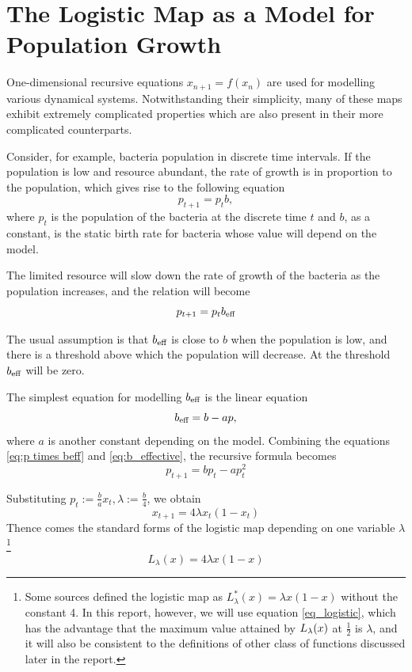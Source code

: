 \section{The Logistic Map as a Model for Population Growth}

One-dimensional recursive equations $x_{n+1} = f(x_n)$ are used for modelling various dynamical systems. 
Notwithstanding their simplicity, many of these maps exhibit extremely complicated properties which are also present in their more complicated counterparts.

Consider, for example, bacteria population in discrete time intervals. 
If the population is low and resource abundant, the rate of growth is in proportion to the population, which gives rise to the following equation
\begin{equation}\label{eq:1d iterative map}
p_{t+1} = p_{t} b,
\end{equation}
where $p_{t}$ is the population of the bacteria at the discrete time $t$ and $b$, as a constant, is the static birth rate for bacteria whose value will depend on the model.

The limited resource will slow down the rate of growth of the bacteria as the population increases, and the relation will become 
\begin{equation}\label{eq:p times beff}
	p_{t+1} =  p_{t} b_\text{eff}
\end{equation}

The usual assumption is that $b_\text{eff}$ is close to $b$ when the population is low, and there is a threshold above which the population will decrease. 
At the threshold $b_\text{eff}$ will be zero.

The simplest equation for modelling $b_\text{eff}$ is the linear equation
\begin{equation} \label{eq:b_effective}
b_\text{eff} = b - ap,
\end{equation}
where $a$ is another constant depending on the model.
Combining the equations \eqref{eq:p times beff} and \eqref{eq:b_effective}, the recursive formula becomes 
$$
p_{t+1}  = b p_t - ap_t^2
$$

Substituting $p_{t} := \frac{b}{a} x_{t}, \lambda := \frac{b}{4}$, we obtain
$$
x_{t+1} = 4 \lambda x_t(1-x_t) 
$$
Thence comes the standard forms of the logistic map depending on one variable $\lambda$
\footnote{
Some sources defined the logistic map as $L^*_{\lambda}(x) = \lambda x(1-x)$ without the constant 4. 
In this report, however, we will use equation \ref{eq_logistic}, which has the advantage that the maximum value attained by $L_{\lambda}(x)$ at $\frac{1}{2}$ is $\lambda$, and it will also be consistent to the definitions of other class of functions discussed later in the report.
}
\begin{equation}\label{eq_logistic}
	L_{\lambda}(x) = 4 \lambda x(1-x)
\end{equation}

